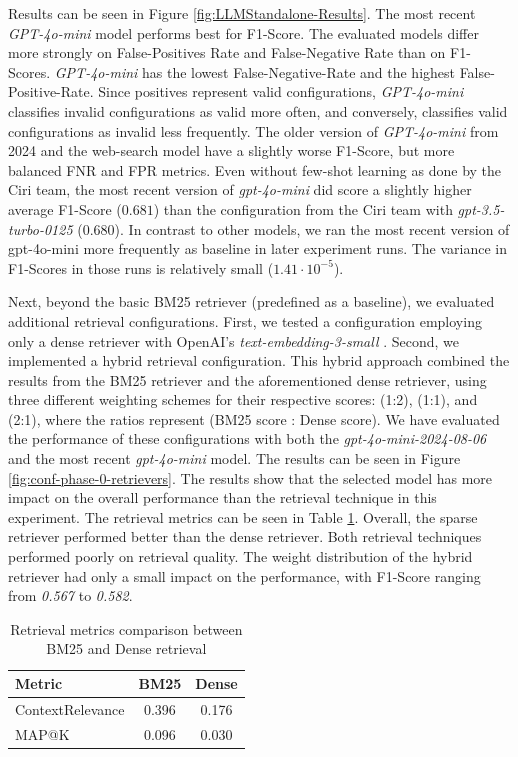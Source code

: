 Results can be seen in Figure \ref{fig:LLMStandalone-Results}. The most recent \textit{GPT-4o-mini} model performs best for F1-Score. The evaluated models differ more strongly on False-Positives Rate and False-Negative Rate than on F1-Scores. \textit{GPT-4o-mini} has the lowest False-Negative-Rate and the highest False-Positive-Rate. Since positives represent valid configurations, \textit{GPT-4o-mini} classifies invalid configurations as valid more often, and conversely, classifies valid configurations as invalid less frequently. The older version of \textit{GPT-4o-mini} from 2024 and the web-search model have a slightly worse F1-Score, but more balanced FNR and FPR metrics. Even without few-shot learning as done by the Ciri team, the most recent version of \textit{gpt-4o-mini} did score a slightly higher average F1-Score ($0.681$) than the configuration from the Ciri team with \textit{gpt-3.5-turbo-0125} ($0.680$). In contrast to other models, we ran the most recent version of gpt-4o-mini more frequently as baseline in later experiment runs. The variance in F1-Scores in those runs is relatively small ($1.41 \cdot 10^{-5}$).


  Next, beyond the basic BM25 retriever (predefined as a baseline), we evaluated additional retrieval configurations. First, we tested a configuration employing only a dense retriever with OpenAI's \textit{text-embedding-3-small} \cite{OpenAI_2022}. Second, we implemented a hybrid retrieval configuration. This hybrid approach combined the results from the BM25 retriever and the aforementioned dense retriever, using three different weighting schemes for their respective scores: (1:2), (1:1), and (2:1), where the ratios represent (BM25 score : Dense score). We have evaluated the performance of these configurations with both the \textit{gpt-4o-mini-2024-08-06} and the most recent \textit{gpt-4o-mini} model. The results can be seen in Figure \ref{fig:conf-phase-0-retrievers}. The results show that the selected model has more impact on the overall performance than the retrieval technique in this experiment. The retrieval metrics can be seen in Table \ref{tab:retrieval_metrics}. Overall, the sparse retriever performed better than the dense retriever. Both retrieval techniques performed poorly on retrieval quality. The weight distribution of the hybrid retriever had only a small impact on the performance, with F1-Score ranging from \textit{0.567} to \textit{0.582}.

\begin{table}[!ht]
    \centering
    \begin{tabular}{|l|c|c|}
        \hline
        \textbf{Metric} & \textbf{BM25} & \textbf{Dense} \\
        \hline
        ContextRelevance & 0.396 & 0.176 \\
        MAP@K & 0.096 & 0.030 \\
        \hline
    \end{tabular}
    \caption{Retrieval metrics comparison between BM25 and Dense retrieval}
    \label{tab:retrieval_metrics}
\end{table}

